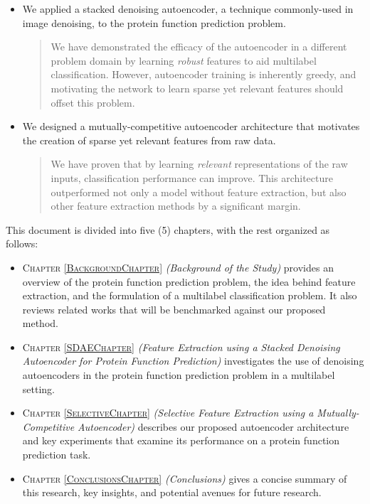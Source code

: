 \begin{itemize}
    \item We applied a stacked denoising autoencoder, a technique
    commonly-used in image denoising, to the protein function prediction problem.
    \begin{quote}
    \par We have demonstrated the efficacy of the autoencoder in a different
    problem domain by learning \textit{robust} features to aid multilabel
    classification. However, autoencoder training is inherently greedy, and
    motivating the network to learn sparse yet relevant features should
    offset this problem.
    \end{quote}
    \item We designed a mutually-competitive autoencoder architecture that
    motivates the creation of sparse yet relevant features from raw data.
    \begin{quote}
    \par We have proven that by learning \textit{relevant} representations
    of the raw inputs, classification performance can improve. This architecture
    outperformed not only a model without feature extraction, but also other
    feature extraction methods by a significant margin. 
    \end{quote}
\end{itemize}



\par \noindent This document is divided into five (5) chapters, with the rest
organized as follows:

\begin{itemize}
    \item \textsc{Chapter \ref{BackgroundChapter}} \textit{(Background of the
    Study)} provides an overview of the protein function prediction problem,
    the idea behind feature extraction, and the formulation of a multilabel
    classification problem. It also reviews related works that will be
    benchmarked against our proposed method.
    \item \textsc{Chapter \ref{SDAEChapter}} \textit{(Feature Extraction
    using a Stacked Denoising Autoencoder for Protein Function Prediction)}
    investigates the use of denoising autoencoders in the protein function
    prediction problem in a multilabel setting.
    \item \textsc{Chapter \ref{SelectiveChapter}} \textit{(Selective Feature
    Extraction using a Mutually-Competitive Autoencoder)} describes our proposed
    autoencoder architecture and key experiments that examine its performance
    on a protein function prediction task.
    \item \textsc{Chapter \ref{ConclusionsChapter}} \textit{(Conclusions)} gives
    a concise summary of this research, key insights, and potential avenues for
    future research.
\end{itemize}